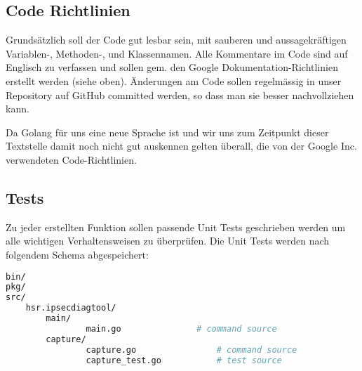 \subsection{Code Richtlinien}
Grundsätzlich soll der Code gut lesbar sein, mit sauberen und aussagekräftigen Variablen-, Methoden-, und Klassennamen. Alle Kommentare im Code sind auf Englisch zu verfassen und sollen gem. den Google Dokumentation-Richtlinien erstellt werden (siehe oben).
Änderungen am Code sollen regelmässig in unser Repository auf GitHub committed werden, so dass man sie besser nachvollziehen kann.

Da Golang für uns eine neue Sprache ist und wir uns zum Zeitpunkt dieser Textstelle damit noch nicht gut auskennen gelten überall, die von der Google Inc. verwendeten Code-Richtlinien.

\subsection{Tests}
Zu jeder erstellten Funktion sollen passende Unit Tests geschrieben werden um alle wichtigen Verhaltensweisen zu überprüfen. Die Unit Tests werden nach folgendem Schema abgespeichert:

\begin{lstlisting}[language=bash, caption=Unit Test Speicherort]
bin/
pkg/
src/
    hsr.ipsecdiagtool/
		main/
	    		main.go               # command source
		capture/
	    		capture.go                # command source
	    		capture_test.go           # test source
\end{lstlisting}